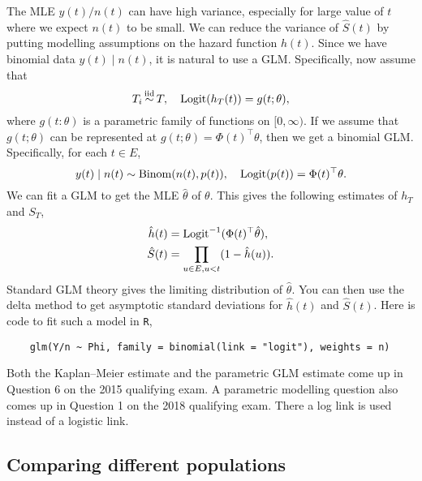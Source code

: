 The MLE $y(t)/n(t)$ can have high variance, especially for large value of $t$ where we expect $n(t)$ to be small. We can reduce the variance of $\hat{S}(t)$ by putting modelling assumptions on the hazard function $h(t)$. Since we have binomial data $y(t)\mid n(t)$, it is natural to use a GLM. Specifically, now assume that
\[
    T_i \simiid T, \quad \logit( h_T(t)) = g(t;\theta),
\] 
where $g(t:\theta)$ is a parametric family of functions on $[0,\infty)$. If we assume that $g(t;\theta)$ can be represented at $g(t;\theta) = \Phi(t)^\top \theta$, then we get a binomial GLM. Specifically, for each $t \in E$,
\[ 
    y(t) \mid n(t) \sim \mathrm{Binom}(n(t), p(t)), \quad \mathrm{Logit}(p(t)) = \Phi(t)^\top \theta.    
\]
We can fit a GLM to get the MLE $\hat{\theta}$ of $\theta$. This gives the following estimates of $h_T$ and $S_T$,
\begin{align*}
    \hat{h}(t)&=\mathrm{Logit}^{-1}(\Phi(t)^\top \hat{\theta}),\\
    \hat{S}(t)&=\prod_{u \in E, u < t}(1-\hat{h}(u)).
\end{align*}
Standard GLM theory gives the limiting distribution of $\hat{\theta}$. You can then use the delta method to get asymptotic standard deviations for $\hat{h}(t)$ and $\hat{S}(t)$. Here is code to fit such a model in \verb|R|,

\begin{verbatim} 
    glm(Y/n ~ Phi, family = binomial(link = "logit"), weights = n) 
\end{verbatim}

Both the Kaplan--Meier estimate and the parametric GLM estimate come up in Question 6 on the 2015 qualifying exam. A parametric modelling question also comes up in Question 1 on the 2018 qualifying exam. There a log link is used instead of a logistic link.

\subsection{Comparing different populations}

